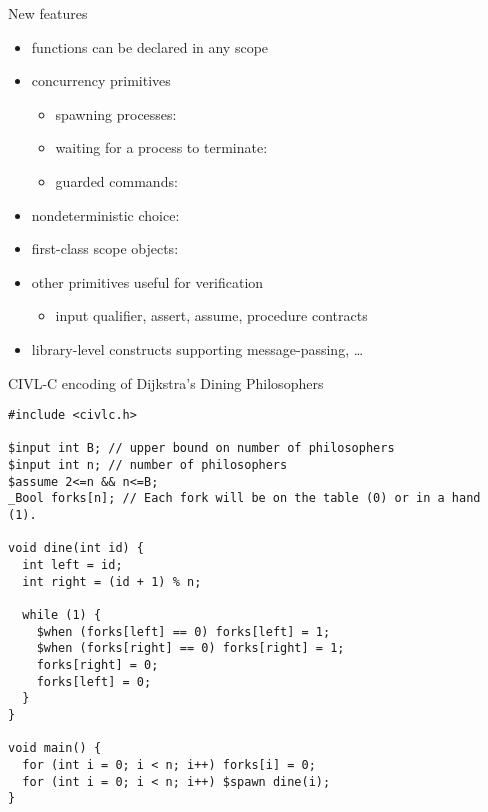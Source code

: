 \documentclass[t]{beamer}
\begin{document}
\begin{frame}{New features}
  \begin{itemize}
  \item functions can be declared in any scope
  \item concurrency primitives
    \begin{itemize}
    \item spawning processes: 
    \item waiting for a process to terminate: 
    \item guarded commands: 
    \end{itemize}
  \item nondeterministic choice: 
  \item first-class scope objects: 
  \item other primitives useful for verification
    \begin{itemize}
    \item input qualifier, assert, assume, procedure contracts
    \end{itemize}
  \item library-level constructs supporting message-passing, \ldots
  \end{itemize}
\end{frame}

\begin{frame}[containsverbatim]{CIVL-C encoding of Dijkstra's Dining Philosophers}
  \begin{scriptsize}
\begin{verbatim}
#include <civlc.h>

$input int B; // upper bound on number of philosophers
$input int n; // number of philosophers
$assume 2<=n && n<=B;
_Bool forks[n]; // Each fork will be on the table (0) or in a hand (1). 

void dine(int id) {
  int left = id;
  int right = (id + 1) % n;

  while (1) {
    $when (forks[left] == 0) forks[left] = 1;
    $when (forks[right] == 0) forks[right] = 1;
    forks[right] = 0;
    forks[left] = 0;
  }
}

void main() {
  for (int i = 0; i < n; i++) forks[i] = 0;
  for (int i = 0; i < n; i++) $spawn dine(i);
}
\end{verbatim}
  \end{scriptsize}
\end{frame}
\end{document}
